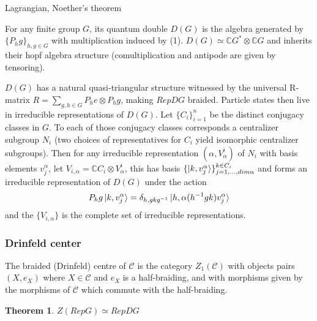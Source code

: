 \documentclass{article}
\newtheorem{theorem}{Theorem}[section]
\newenvironment{definition}[1][Definition]{\begin{trivlist}
\item[\hskip \labelsep {\bfseries #1}]}{\end{trivlist}}
\begin{document}
\begin{definition}
Lagrangian, Noether's theorem
\end{definition}
\begin{definition}
For any finite group $G$, its quantum double $D(G)$ is the algebra generated by $\{P_hg\}_{h,g\in G}$ with multiplication induced by (1). $D(G) \simeq \mathbb{C}G^* \otimes \mathbb{C}G$ and inherits their hopf algebra structure (comultiplication and antipode are given by tensoring). 
\end{definition}
$D(G)$ has a natural quasi-triangular structure witnessed by the universal R-matrix $R=\sum_{g,h \in G}P_he \otimes P_hg$, making $RepDG$ braided. Particle states then live in irreducible representations of $D(G)$. Let $\{C_i\}_{i=1}^n$ be the distinct conjugacy classes in $G$. To each of those conjugacy classes corresponds a centralizer subgroup $N_i$ (two choices of representatives for $C_i$ yield isomorphic centralizer subgroups). Then for any irreducible representation $(\alpha,V^i_\alpha)$ of $N_i$ with basis elements $v^\alpha_j$, let $V_{i,\alpha} = \mathbb{C}C_i \otimes V^i_\alpha$, this has basis $\{ \ket{k,v^\alpha_j} \}_{j=1,...,dim\alpha}^{k\in C_i}$ and forms an irreducible representation of $D(G)$ under the action 
\begin{equation}
P_hg\ket{k,v^\alpha_j} = \delta_{h,gkg^{-1}} \ket{h,\alpha(h^{-1}gk)v^\alpha_j}
\end{equation}
and the $\{V_{i,\alpha}\}$ is the complete set of irreducible representations.


\subsubsection{Drinfeld center}
\begin{definition}
The braided (Drinfeld) centre of $\mathcal{C}$ is the category $Z_1(\mathcal{C})$ with objects pairs $(X,e_X)$ where $X \in \mathcal{C}$ and $e_X$ is a half-braiding, and with morphisms given by the morphisms of $\mathcal{C}$ which commute with the half-braiding.
\end{definition}
\begin{theorem}
$Z(RepG) \simeq RepDG$
\end{theorem}
\end{document}
